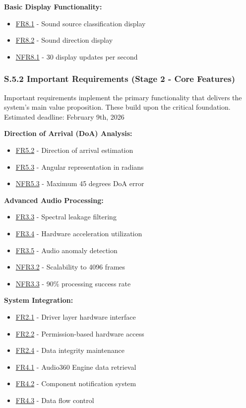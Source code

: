\documentclass[12pt]{article}
\theoremstyle{definition}
\begin{document}
\textbf{Basic Display Functionality:}
\begin{itemize}
    \item \hyperref[FR8_1]{FR8.1} - Sound source classification display
    \item \hyperref[FR8_2]{FR8.2} - Sound direction display
    \item \hyperref[NFR8_1]{NFR8.1} - 30 display updates per second
\end{itemize}

\subsubsection{S.5.2 Important Requirements (Stage 2 - Core Features)}

Important requirements implement the primary functionality that delivers the
system's main value proposition. These build upon the critical foundation. \\
\newline
Estimated deadline: February 9th, 2026 \\
\newline

\textbf{Direction of Arrival (DoA) Analysis:}
\begin{itemize}
    \item \hyperref[FR5_2]{FR5.2} - Direction of arrival estimation
    \item \hyperref[FR5_3]{FR5.3} - Angular representation in radians
    \item \hyperref[NFR5_3]{NFR5.3} - Maximum 45 degrees DoA error
\end{itemize}

\textbf{Advanced Audio Processing:}
\begin{itemize}
    \item \hyperref[FR3_3]{FR3.3} - Spectral leakage filtering
    \item \hyperref[FR3_4]{FR3.4} - Hardware acceleration utilization
    \item \hyperref[FR3_5]{FR3.5} - Audio anomaly detection
    \item \hyperref[NFR3_2]{NFR3.2} - Scalability to 4096 frames
    \item \hyperref[NFR3_3]{NFR3.3} - 90\% processing success rate
\end{itemize}

\textbf{System Integration:}
\begin{itemize}
    \item \hyperref[FR2_1]{FR2.1} - Driver layer hardware interface
    \item \hyperref[FR2_2]{FR2.2} - Permission-based hardware access
    \item \hyperref[FR2_4]{FR2.4} - Data integrity maintenance
    \item \hyperref[FR4_1]{FR4.1} - Audio360 Engine data retrieval
    \item \hyperref[FR4_2]{FR4.2} - Component notification system
    \item \hyperref[FR4_3]{FR4.3} - Data flow control
\end{itemize}
\end{document}
